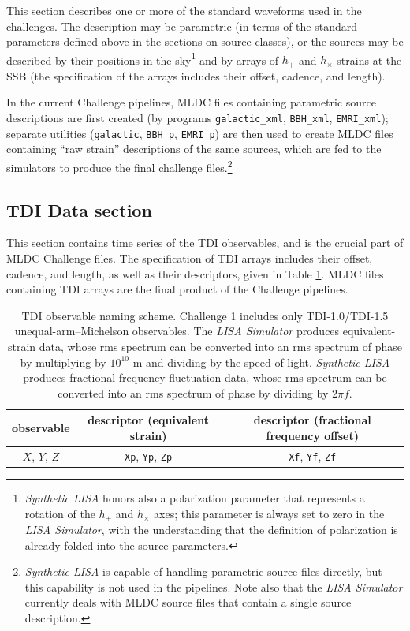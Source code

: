 \documentclass[11pt]{report}
\begin{document}
This section describes one or more of the standard waveforms used in the challenges. The description may be parametric (in terms of the standard parameters defined above in the sections on source classes), or the sources may be described by their positions in the sky\footnote{\emph{Synthetic LISA} honors also a polarization parameter that represents a rotation of the $h_+$ and $h_\times$ axes; this parameter is always set to zero in the \emph{LISA Simulator}, with the understanding that the definition of polarization is already folded into the source parameters.} and by arrays of $h_+$ and $h_\times$ strains at the SSB (the specification of the arrays includes their offset, cadence, and length).

In the current Challenge pipelines, MLDC files containing parametric source descriptions are first created (by programs \texttt{galactic\_xml}, \texttt{BBH\_xml}, \texttt{EMRI\_xml}); separate utilities (\texttt{galactic}, \texttt{BBH\_p}, \texttt{EMRI\_p}) are then used to create MLDC files containing ``raw strain'' descriptions of the same sources, which are fed to the simulators to produce the final challenge files.\footnote{\emph{Synthetic LISA} is capable of handling parametric source files directly, but this capability is not used in the pipelines. Note also that the \emph{LISA Simulator} currently deals with MLDC source files that contain a single source description.}

\subsection{TDI Data section}

This section contains time series of the TDI observables, and is the crucial part of MLDC Challenge files. The specification of TDI arrays includes their offset, cadence, and length, as well as their descriptors, given in Table \ref{tab:tdinames}.
MLDC files containing TDI arrays are the final product of the Challenge pipelines.
%
\begin{table}
\begin{center}
\begin{tabular}{c|c|c}
observable & descriptor (equivalent strain) & descriptor (fractional frequency offset) \\
\hline
$X$, $Y$, $Z$ & \texttt{Xp}, \texttt{Yp}, \texttt{Zp} & \texttt{Xf}, \texttt{Yf}, \texttt{Zf}
\end{tabular}
\end{center}
\caption{TDI observable naming scheme. Challenge 1 includes only TDI-1.0/TDI-1.5 unequal-arm--Michelson observables. The \emph{LISA Simulator} produces equivalent-strain data, whose rms spectrum can be converted into an rms spectrum of phase by multiplying by $10^10$ m and dividing by the speed of light. \emph{Synthetic LISA} produces fractional-frequency-fluctuation data, whose rms spectrum can be converted into an rms spectrum of phase by dividing by $2\pi f$. 
\label{tab:tdinames}}
\end{table}
\end{document}
